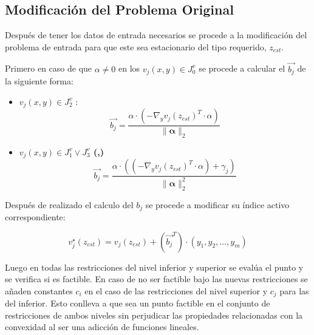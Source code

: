 \subsection{Modificación del Problema Original}
Después de tener los datos de entrada necesarios se procede a la modificación
del problema de entrada para que este sea estacionario del tipo requerido, $z_{est}$.

\begin{samepage}
Primero en caso de que $\alpha \neq 0$ en los $v_j(x,y) \in J_0^v$ se procede a calcular el $\vec{b_j}$ de la siguiente forma:

\begin{itemize}
    \item \textbf{ $v_j(x,y) \in J_2^v$ }:
        \begin{equation}
            \vec{b_j}=  \frac{{\alpha} \cdot (-\nabla_{y}{v_j(z_{est})}^T \cdot \alpha)}{\|\mathbf{\alpha} \|_2}
        \end{equation}
    \item \textbf{$v_j(x,y) \in J_1^v \lor J_3^v$ (,)}\\
    \begin{equation}
        \vec{b_j}=  \frac{{\alpha} \cdot ((-\nabla_{y}{v_j(z_{est})}^T \cdot \alpha)+\gamma_j)}{\|\mathbf{\alpha} \|_2^2}
    \end{equation}
\end{itemize}


Después de realizado el calculo del $b_j$ se procede a modificar su índice activo correspondiente:

\begin{equation}
	v_{j}^{\star}(z_{est})=v_{j}(z_{est})+ ({\vec{b_j}}^T)\cdot (y_1,y_2,\dots,y_m)
\end{equation}
\end{samepage}

Luego en todas las restricciones del nivel inferior y superior
se evalúa el punto y se verifica si es factible. En caso de no ser factible 
bajo las nuevas restricciones se añaden constantes $c_i$ en el caso de las restricciones del
nivel superior y $c_j$ para las del inferior. Esto conlleva a que sea un punto factible en el conjunto
de restricciones de ambos niveles sin perjudicar las propiedades relacionadas con la convexidad al ser una adicción
de funciones lineales. 

